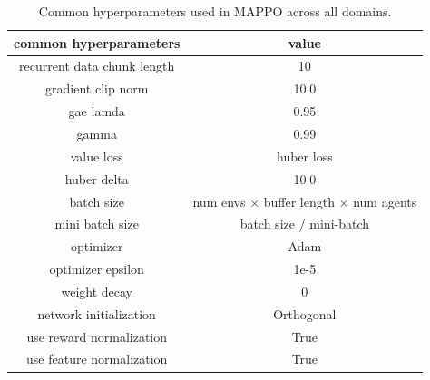 \begin{table}[bt]
\centering
\begin{tabular}{cc}
\toprule
common hyperparameters      & value  \\
\midrule
recurrent data chunk length & 10   \\
gradient clip norm          & 10.0 \\
gae lamda                   & 0.95    \\              
gamma                       & 0.99 \\
value loss                        & huber loss \\
huber delta                 & 10.0   \\
batch size                   & num envs $\times$ buffer length $\times$ num agents  \\
mini batch size           & batch size {/} mini-batch  \\
optimizer                & Adam       \\
optimizer epsilon            & 1e-5       \\
weight decay             & 0          \\
network initialization  & Orthogonal \\
use reward normalization   &True \\
use feature normalization   &True \\

\bottomrule
\end{tabular}
\caption{Common hyperparameters used in MAPPO across all domains.}
\label{tab:MAPPO-common-parameters}
\end{table}


